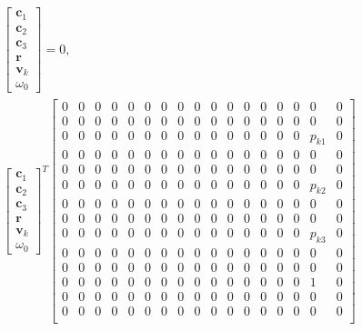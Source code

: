 \documentclass{article}
\begin{document}
\begin{align}
    \begin{bmatrix}
        \mathbf{c}_1 \\
        \mathbf{c}_2 \\
        \mathbf{c}_3 \\
        \mathbf{r} \\
        \mathbf{v}_k \\
        \omega_0
    \end{bmatrix} = 0, \\
    \begin{bmatrix}
        \mathbf{c}_1 \\
        \mathbf{c}_2 \\
        \mathbf{c}_3 \\
        \mathbf{r} \\
        \mathbf{v}_k \\
        \omega_0
    \end{bmatrix}^T 
    \begin{bmatrix}
        0 & 0 & 0 & 0 & 0 & 0 & 0 & 0 & 0 & 0 & 0 & 0 & 0 & 0 & 0 & 0 & 0 \\
        0 & 0 & 0 & 0 & 0 & 0 & 0 & 0 & 0 & 0 & 0 & 0 & 0 & 0 & 0 & 0 & 0 \\
        0 & 0 & 0 & 0 & 0 & 0 & 0 & 0 & 0 & 0 & 0 & 0 & 0 & 0 & 0 & p_{k1} & 0 \\
        0 & 0 & 0 & 0 & 0 & 0 & 0 & 0 & 0 & 0 & 0 & 0 & 0 & 0 & 0 & 0 & 0 \\
        0 & 0 & 0 & 0 & 0 & 0 & 0 & 0 & 0 & 0 & 0 & 0 & 0 & 0 & 0 & 0 & 0 \\
        0 & 0 & 0 & 0 & 0 & 0 & 0 & 0 & 0 & 0 & 0 & 0 & 0 & 0 & 0 & p_{k2} & 0 \\
        0 & 0 & 0 & 0 & 0 & 0 & 0 & 0 & 0 & 0 & 0 & 0 & 0 & 0 & 0 & 0 & 0 \\
        0 & 0 & 0 & 0 & 0 & 0 & 0 & 0 & 0 & 0 & 0 & 0 & 0 & 0 & 0 & 0 & 0 \\
        0 & 0 & 0 & 0 & 0 & 0 & 0 & 0 & 0 & 0 & 0 & 0 & 0 & 0 & 0 & p_{k3} & 0 \\
        0 & 0 & 0 & 0 & 0 & 0 & 0 & 0 & 0 & 0 & 0 & 0 & 0 & 0 & 0 & 0 & 0 \\
        0 & 0 & 0 & 0 & 0 & 0 & 0 & 0 & 0 & 0 & 0 & 0 & 0 & 0 & 0 & 0 & 0 \\
        0 & 0 & 0 & 0 & 0 & 0 & 0 & 0 & 0 & 0 & 0 & 0 & 0 & 0 & 0 & 1 & 0 \\
        0 & 0 & 0 & 0 & 0 & 0 & 0 & 0 & 0 & 0 & 0 & 0 & 0 & 0 & 0 & 0 & 0 \\
        0 & 0 & 0 & 0 & 0 & 0 & 0 & 0 & 0 & 0 & 0 & 0 & 0 & 0 & 0 & 0 & 0 \\

\end{bmatrix}
\end{align}
\end{document}
